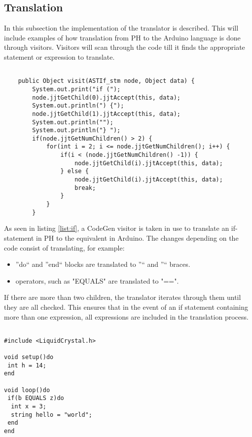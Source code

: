 \subsection{Translation}
In this subsection the implementation of the translator is described. This will include examples of how translation from PH to the Arduino language is done through visitors.
Visitors will scan through the code till it finds the appropriate statement or expression to translate.

\begin{lstlisting}[caption=Visitor for translation of an if-statement, label=list:if]

	public Object visit(ASTIf_stm node, Object data) {
		System.out.print("if (");
		node.jjtGetChild(0).jjtAccept(this, data);
		System.out.println(") {");
		node.jjtGetChild(1).jjtAccept(this, data);
		System.out.println("");
		System.out.println("} ");
		if(node.jjtGetNumChildren() > 2) {
			for(int i = 2; i <= node.jjtGetNumChildren(); i++) {
				if(i < (node.jjtGetNumChildren() -1)) {
					node.jjtGetChild(i).jjtAccept(this, data);
				} else {
					node.jjtGetChild(i).jjtAccept(this, data);
					break;
				}
			}
		}

\end{lstlisting}

As seen in listing \ref{list:if}, a CodeGen visitor is taken in use to translate an if-statement in PH to the equivalent in Arduino. The changes depending on the code consist of translating, for example:\\
\begin{itemize}
\item ''do`` and ''end`` blocks are translated to ''{`` and ''}`` braces.
\item operators, such as "EQUALS" are translated to "==". 
\end{itemize}
If there are more than two children, the translator iterates through them until they are all checked. This ensures that in the event of an if statement containing more than one expression, all expressions are included in the translation process.\\
\begin{lstlisting}[caption=Example of an if-statement written in PH, label=list:phstmt]

#include <LiquidCrystal.h>

void setup()do
 int h = 14;
end

void loop()do
 if(b EQUALS z)do
  int x = 3;
  string hello = "world";
 end
end
\end{lstlisting}

